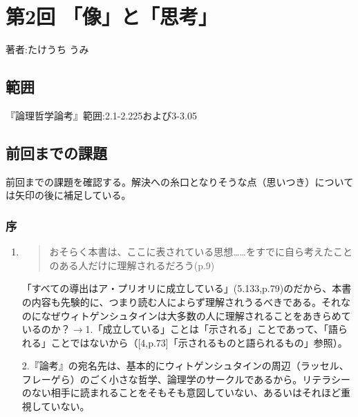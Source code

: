 \documentclass[11pt,a4paper]{jsbook}
\begin{document}
\chapter{第2回 「像」と「思考」}

著者:たけうち うみ

\section{範囲}
『論理哲学論考』範囲:2.1-2.225および3-3.05

\section{前回までの課題} \label{zenkadai}

前回までの課題を確認する。解決への糸口となりそうな点（思いつき）については矢印の後に補足している。

\subsection{序}
\begin{enumerate}
\item
\begin{quote}おそらく本書は、ここに表されている思想……をすでに自ら考えたことのある人だけに理解されるだろう(p.9)
\end{quote}
「すべての導出はア・プリオリに成立している」(5.133,p.79)のだから、本書の内容も先験的に、つまり読む人によらず理解されうるべきである。それなのになぜウィトゲンシュタインは大多数の人に理解されることをあきらめているのか？$\rightarrow$1.「成立している」ことは「示される」ことであって、「語られる」ことではないから（[4,p.73]「示されるものと語られるもの」参照）。

2.『論考』の宛名先は、基本的にウィトゲンシュタインの周辺（ラッセル、フレーゲら）のごく小さな哲学、論理学のサークルであるから。リテラシーのない相手に読まれることをそもそも意図していない、あるいはそれほど重視していない。
\end{enumerate}
\end{document}
